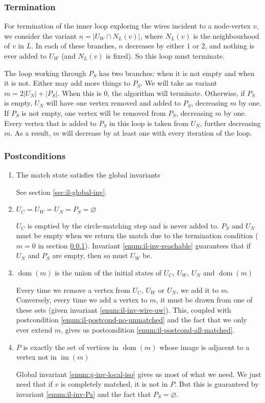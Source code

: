 \documentclass{article}
\DeclareMathOperator{\dom}{dom}
\DeclareMathOperator{\im}{im}
\begin{document}
\subsubsection{Termination}
\label{sec:termination}

For termination of the inner loop exploring the wires incident to a node-vertex $v$, we consider the variant $n = |U_W\cap N_L(v)|$, where $N_L(v)$ is the neighbourhood of $v$ in $L$.  In each of these branches, $n$ decreases by either $1$ or $2$, and nothing is ever added to $U_W$ (and $N_L(v)$ is fixed).  So this loop must terminate.

The loop working through $P_S$ has two branches: when it is not empty and when it is not.  Either may add more things to $P_S$.  We will take as variant $m = 2|U_N| + |P_S|$.  When this is $0$, the algorithm will terminate.  Otherwise, if $P_S$ is empty, $U_N$ will have one vertex removed and added to $P_S$, decreasing $m$ by one.  If $P_S$ is not empty, one vertex will be removed from $P_S$, decreasing $m$ by one.  Every vertex that is added to $P_S$ in this loop is taken from $U_N$, further decreasing $m$.  As a result, $m$ will decrease by at least one with every iteration of the loop.

\subsubsection{Postconditions}

\begin{enumerate}
  \renewcommand{\theenumi}{(\Roman{enumi})}
  \renewcommand{\labelenumi}{\theenumi}
  \item The match state satisfies the global invariants

  See section \ref{sec:il-global-inv}.
  \item $U_C = U_W = U_N = P_S = \varnothing$

  $U_C$ is emptied by the circle-matching step and is never added to.  $P_S$ and $U_N$ must be empty when we return the match due to the termination condition ($m = 0$ in section \ref{sec:termination}).  Invariant \ref{enum:il-inv-reachable} guarantees that if $U_N$ and $P_S$ are empty, then so must $U_W$ be.
  \item $\dom(m)$ is the union of the initial states of $U_C$, $U_W$, $U_N$ and $\dom(m)$

  Every time we remove a vertex from $U_C$, $U_W$ or $U_N$, we add it to $m$.  Conversely, every time we add a vertex to $m$, it must be drawn from one of these sets (given invariant \ref{enum:il-inv-wire-uw}).  This, coupled with postcondition \ref{enum:il-postcond-no-unmatched} and the fact that we only ever extend $m$, gives us postcondition \ref{enum:il-postcond-all-matched}.

  \item $P$ is exactly the set of vertices in $\dom(m)$ whose image is adjacent to a vertex not in $\im(m)$

  Global invariant \ref{enum:g-inv-local-iso} gives us most of what we need.  We just need that if $v$ is completely matched, it is not in $P$.  But this is guaranteed by invariant \ref{enum:il-inv-Ps} and the fact that $P_S = \varnothing$.
\end{enumerate}
\end{document}
